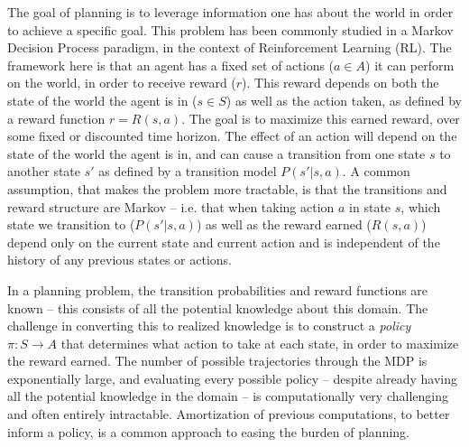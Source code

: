 The goal of planning is to leverage information one has about the world in order to achieve a specific goal. This problem has been commonly studied in a Markov Decision Process paradigm, in the context of Reinforcement Learning (RL). The framework here is that an agent has a fixed set of actions ($a \in A$) it can perform on the world, in order to receive reward ($r$). This reward depends on both the state of the world the agent is in ($s \in S$) as well as the action taken, as defined by a reward function $r = R(s, a)$. The goal is to maximize this earned reward, over some fixed or discounted time horizon. The effect of an action will depend on the state of the world the agent is in, and can cause a transition from one state $s$ to another state $s'$ as defined by a transition model $P(s' | s, a)$. A common assumption, that makes the problem more tractable, is that the transitions and reward structure are Markov -- i.e. that when taking action $a$ in state $s$, which state we transition to ($P(s' | s, a)$) as well as the reward earned ($R(s,a)$) depend only on the current state and current action and is independent of the history of any previous states or actions.

In a planning problem, the transition probabilities and reward functions are known -- this consists of all the potential knowledge about this domain. The challenge in converting this to realized knowledge is to construct a \textit{policy} $\pi: S \rightarrow A$ that determines what action to take at each state, in order to maximize the reward earned. The number of possible trajectories through the MDP is exponentially large, and evaluating every possible policy -- despite already having all the potential knowledge in the domain -- is computationally very challenging and often entirely intractable. Amortization of previous computations, to better inform a policy, is a common approach to easing the burden of planning.



